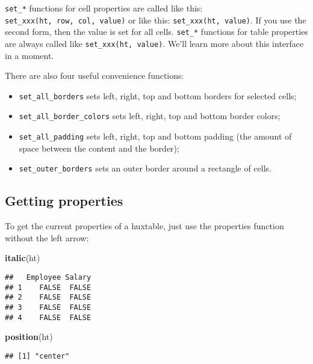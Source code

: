 \documentclass[]{article}
\newenvironment{Shaded}{\begin{snugshade}}{\end{snugshade}}
\newcommand{\KeywordTok}[1]{\textcolor[rgb]{0.13,0.29,0.53}{\textbf{#1}}}
\newcommand{\NormalTok}[1]{#1}
\providecommand{\tightlist}{%
  \setlength{\itemsep}{0pt}\setlength{\parskip}{0pt}}
\begin{document}
\FloatBarrier

\texttt{set\_*} functions for cell properties are called like this:
\texttt{set\_xxx(ht,\ row,\ col,\ value)} or like this:
\texttt{set\_xxx(ht,\ value)}. If you use the second form, then the
value is set for all cells. \texttt{set\_*} functions for table
properties are always called like \texttt{set\_xxx(ht,\ value)}. We'll
learn more about this interface in a moment.

There are also four useful convenience functions:

\begin{itemize}
\tightlist
\item
  \texttt{set\_all\_borders} sets left, right, top and bottom borders
  for selected cells;
\item
  \texttt{set\_all\_border\_colors} sets left, right, top and bottom
  border colors;
\item
  \texttt{set\_all\_padding} sets left, right, top and bottom padding
  (the amount of space between the content and the border);
\item
  \texttt{set\_outer\_borders} sets an outer border around a rectangle
  of cells.
\end{itemize}

\subsection{Getting properties}\label{getting-properties}

To get the current properties of a huxtable, just use the properties
function without the left arrow:

\begin{Shaded}
\begin{Highlighting}[]
\KeywordTok{italic}\NormalTok{(ht)}
\end{Highlighting}
\end{Shaded}

\begin{verbatim}
##   Employee Salary
## 1    FALSE  FALSE
## 2    FALSE  FALSE
## 3    FALSE  FALSE
## 4    FALSE  FALSE
\end{verbatim}

\begin{Shaded}
\begin{Highlighting}[]
\KeywordTok{position}\NormalTok{(ht)}
\end{Highlighting}
\end{Shaded}

\begin{verbatim}
## [1] "center"
\end{verbatim}
\end{document}
